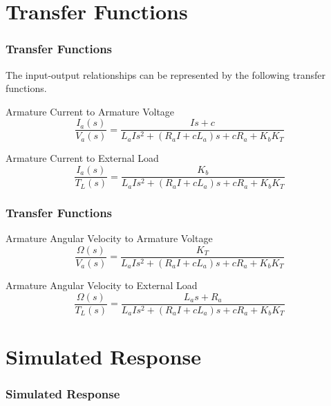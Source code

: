 \documentclass{beamer}                  %
\newcommand{\sectiontitleIV}{Transfer Functions}
\newcommand{\sectiontitleV}{Simulated Response}
\begin{document}
\section{\sectiontitleIV}

	\begin{frame}[label=sectionIV] \small
		\frametitle{\sectiontitleIV}
		The input-output relationships can be represented by the following transfer functions.

		Armature Current to Armature Voltage
		\[\frac{I_a\left(s\right)}{V_a\left(s\right)}=\frac{Is+c}{L_aIs^2+\left(R_aI+cL_a\right)s+cR_a+K_bK_T}\]
		
		Armature Current to External Load
		\[\frac{I_a\left(s\right)}{T_L\left(s\right)}=\frac{K_b}{L_aIs^2+\left(R_aI+cL_a\right)s+cR_a+K_bK_T}\]

	\end{frame}	

	\begin{frame}[label=sectionIV] \small
		\frametitle{\sectiontitleIV}

		Armature Angular Velocity to Armature Voltage
		\[\frac{\Omega\left(s\right)}{V_a\left(s\right)}=\frac{K_T}{L_aIs^2+\left(R_aI+cL_a\right)s+cR_a+K_bK_T}\]
		
		Armature Angular Velocity to External Load
		\[\frac{\Omega\left(s\right)}{T_L\left(s\right)}=\frac{L_as+R_a}{L_aIs^2+\left(R_aI+cL_a\right)s+cR_a+K_bK_T}\]

	\end{frame}	

\section{\sectiontitleV}

	\begin{frame}[label=sectionV] \small
		\frametitle{\sectiontitleV}
		
	\end{frame}	
\end{document}
